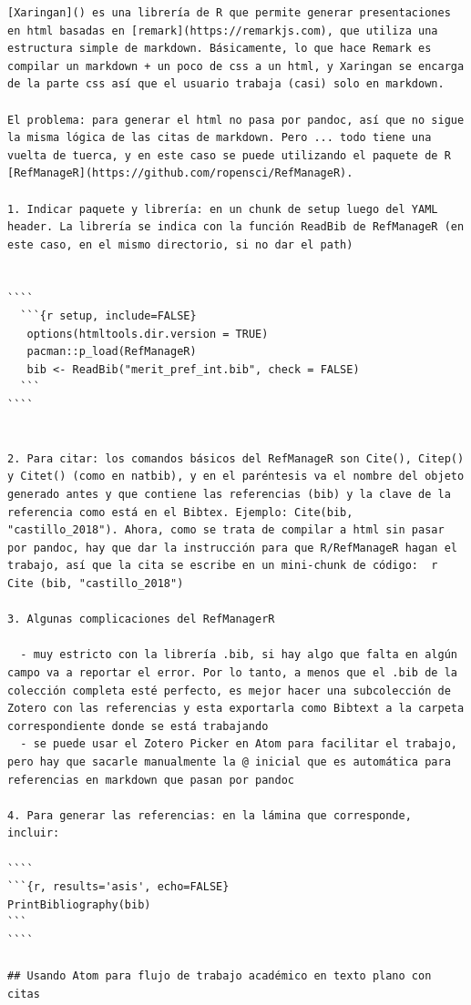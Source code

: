\documentclass[
  11pt,
]{book}
\begin{document}
\begin{verbatim}
[Xaringan]() es una librería de R que permite generar presentaciones en html basadas en [remark](https://remarkjs.com), que utiliza una estructura simple de markdown. Básicamente, lo que hace Remark es compilar un markdown + un poco de css a un html, y Xaringan se encarga de la parte css así que el usuario trabaja (casi) solo en markdown.

El problema: para generar el html no pasa por pandoc, así que no sigue la misma lógica de las citas de markdown. Pero ... todo tiene una vuelta de tuerca, y en este caso se puede utilizando el paquete de R [RefManageR](https://github.com/ropensci/RefManageR).

1. Indicar paquete y librería: en un chunk de setup luego del YAML header. La librería se indica con la función ReadBib de RefManageR (en este caso, en el mismo directorio, si no dar el path)


````
  ```{r setup, include=FALSE}
   options(htmltools.dir.version = TRUE)
   pacman::p_load(RefManageR)
   bib <- ReadBib("merit_pref_int.bib", check = FALSE)
  ```
````


2. Para citar: los comandos básicos del RefManageR son Cite(), Citep() y Citet() (como en natbib), y en el paréntesis va el nombre del objeto generado antes y que contiene las referencias (bib) y la clave de la referencia como está en el Bibtex. Ejemplo: Cite(bib, "castillo_2018"). Ahora, como se trata de compilar a html sin pasar por pandoc, hay que dar la instrucción para que R/RefManageR hagan el trabajo, así que la cita se escribe en un mini-chunk de código:  r Cite (bib, "castillo_2018")

3. Algunas complicaciones del RefManagerR

  - muy estricto con la librería .bib, si hay algo que falta en algún campo va a reportar el error. Por lo tanto, a menos que el .bib de la colección completa esté perfecto, es mejor hacer una subcolección de Zotero con las referencias y esta exportarla como Bibtext a la carpeta correspondiente donde se está trabajando
  - se puede usar el Zotero Picker en Atom para facilitar el trabajo, pero hay que sacarle manualmente la @ inicial que es automática para referencias en markdown que pasan por pandoc

4. Para generar las referencias: en la lámina que corresponde, incluir:

````
```{r, results='asis', echo=FALSE}
PrintBibliography(bib)
```
````

## Usando Atom para flujo de trabajo académico en texto plano con citas


\end{verbatim}
\end{document}
